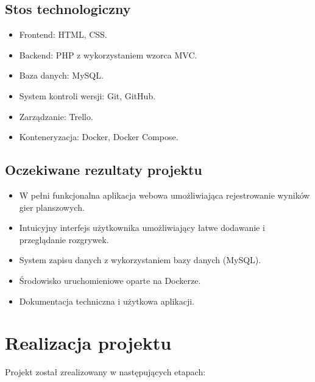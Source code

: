 \documentclass[12pt,a4paper]{article}
\begin{document}
\subsection{Stos technologiczny}
\begin{itemize}
	\item Frontend: HTML, CSS.
	\item Backend: PHP z wykorzystaniem wzorca MVC.
	\item Baza danych: MySQL.
	\item System kontroli wersji: Git, GitHub.
	\item Zarządzanie: Trello.
	\item Konteneryzacja: Docker, Docker Compose.
\end{itemize}

\subsection{Oczekiwane rezultaty projektu}
\begin{itemize}
	\item W pełni funkcjonalna aplikacja webowa umożliwiająca rejestrowanie wyników gier planszowych.
	\item Intuicyjny interfejs użytkownika umożliwiający łatwe dodawanie i przeglądanie rozgrywek.
	\item System zapisu danych z wykorzystaniem bazy danych (MySQL).
	\item Środowisko uruchomieniowe oparte na Dockerze.
	\item Dokumentacja techniczna i użytkowa aplikacji.
\end{itemize}

\section{Realizacja projektu}
Projekt został zrealizowany w następujących etapach:
\end{document}
